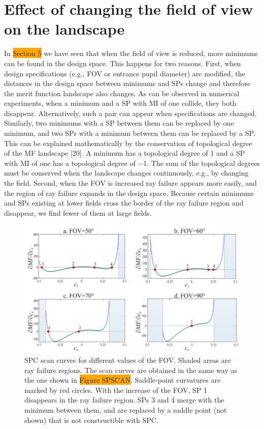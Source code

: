 \section{Effect of changing the field of view on the landscape}
In \colorbox{orange}{Section 5} we have seen that when the field of view is reduced, more minimums can be found in the design space. This happens for two reasons. First, when design specifications (e.g., FOV or entrance pupil diameter) are modified, the distances in the design space between minimums and SPs change
and therefore the merit function landscape also changes. As can be observed in numerical experiments, when a minimum and a SP with MI of one collide, they both disappear. Alternatively, such a pair can appear when specifications are changed. Similarly, two minimums with a SP between them can be replaced by one minimum, and two SPs with a minimum between them can be replaced by a SP. This can be explained mathematically by the conservation of topological degree of the MF landscape [20]. A minimum has a topological degree of 1 and a SP with MI of one has a topological degree of −1. The sum of the topological degrees must be conserved when the landscape changes continuously, e.g., by changing the field. Second, when the FOV is increased ray failure appears more easily, and the region of ray failure expands in the design space. Because certain minimums and SPs existing at lower fields cross the border of the ray failure region and disappear, we find fewer of them at large fields.

\begin{figure}[h!]
    \centering
    \includegraphics[width=1.0\textwidth]{chapter-3/figures/PhaseTransition_field.png}
    \caption{SPC scan curves for different values of the FOV. Shaded areas are ray failure regions. The scan curves are obtained in the same way as the one shown in \colorbox{orange}{Figure SPSCAN}. Saddle-point curvatures are marked by red circles. With the increase of the FOV, SP 1 disappears in the ray failure region. SPs 3 and 4 merge with the minimum between them, and are replaced by a saddle point (not shown) that is not constructible with SPC.}
    \label{fig:phasechange_field}
\end{figure}

